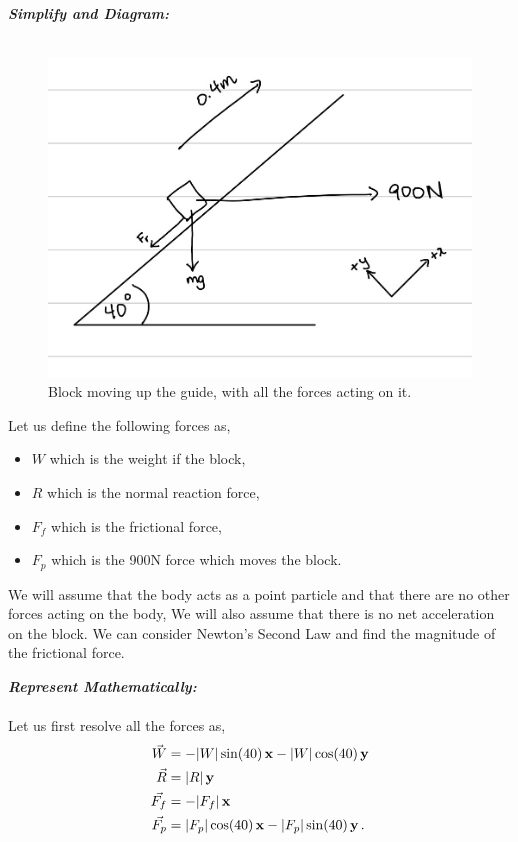 \begin{subquestions}
\begin{subsubquestions}

\subsubquestion

\textbf{\textit{Simplify and Diagram:}} \\ \\
\begin{figure}[H]
	\begin{center}
		\includegraphics[scale=0.25]{../2011/figures/2011q6-1}
		\caption{\label{2011:q6:Diagram3} Block moving up the guide, with all the forces acting on it.}
	\end{center}
\end{figure}

Let us define the following forces as,
\begin{itemize}
	\item $W$ which is the weight if the block,
	\item $R$ which is the normal reaction force,
	\item $F_f$ which is the frictional force,
	\item $F_{p}$ which is the 900N force which moves the block.
\end{itemize}
We will assume that the body acts as a point particle and that there are no other forces acting on the body, We will also assume that there is no net acceleration on the block. We can consider Newton's Second Law and find the magnitude of the frictional force.




\textbf{\textit{Represent Mathematically:}} \\ \\
Let us first resolve all the forces as,
\begin{align}
	\vec{W} & = -|W|\sin(40)\,\mathbf{x} - |W|\cos(40)\,\mathbf{y}  \\ 
	\vec{R} & = |R|\,\mathbf{y}  \\ 
	\vec{F_f} & = -|F_f|\,\mathbf{x}  \\
	\vec{F_p} & = |F_p|\cos(40) \,\mathbf{x} -|F_p|\sin(40) \,\mathbf{y} \,.
\end{align}


\end{subsubquestions}
\end{subquestions}
